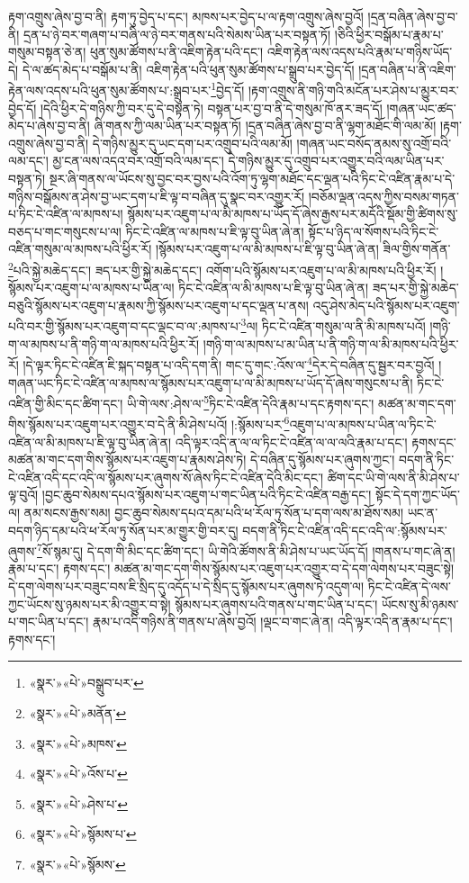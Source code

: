 རྟག་འགྲུས་ཞེས་བྱ་བ་ནི། རྟག་ཏུ་བྱེད་པ་དང་། མཁས་པར་བྱེད་པ་ལ་རྟག་འགྲུས་ཞེས་བྱའོ། །དྲན་བཞིན་ཞེས་བྱ་བ་ནི། དྲན་པ་ཉེ་བར་གཞག་པ་བཞི་ལ་ཉེ་བར་གནས་པའི་སེམས་ཡིན་པར་བསྟན་ཏོ། །ཅིའི་ཕྱིར་བསྒོམ་པ་རྣམ་པ་གསུམ་བསྟན་ཅེ་ན། ཕུན་སུམ་ཚོགས་པ་ནི་འཇིག་རྟེན་པའི་དང་། འཇིག་རྟེན་ལས་འདས་པའི་རྣམ་པ་གཉིས་ཡོད་དེ། དེ་ལ་ཚད་མེད་པ་བསྒོམ་པ་ནི། འཇིག་རྟེན་པའི་ཕུན་སུམ་ཚོགས་པ་སྒྲུབ་པར་བྱེད་དོ། །དྲན་བཞིན་པ་ནི་འཇིག་རྟེན་ལས་འདས་པའི་ཕུན་སུམ་ཚོགས་པ་:སྒྲུབ་པར་\footnote{«སྣར་»«པེ་»བསྒྲུབ་པར་}བྱེད་དོ། །རྟག་འགྲུས་ནི་གཉི་གའི་མངོན་པར་ཤེས་པ་མྱུར་བར་བྱེད་དོ། །དེའི་ཕྱིར་དེ་གཉིས་ཀྱི་བར་དུ་དེ་བསྟན་ཏེ། བསྟན་པར་བྱ་བ་ནི་དེ་གསུམ་ཁོ་ནར་ཟད་དོ། །གཞན་ཡང་ཚད་མེད་པ་ཞེས་བྱ་བ་ནི། ཞི་གནས་ཀྱི་ལམ་ཡིན་པར་བསྟན་ཏོ། །དྲན་བཞིན་ཞེས་བྱ་བ་ནི་ལྷག་མཐོང་གི་ལམ་མོ། །རྟག་འགྲུས་ཞེས་བྱ་བ་ནི། དེ་གཉིས་མྱུར་དུ་ཡང་དག་པར་འགྲུབ་པའི་ལམ་མོ། །གཞན་ཡང་བསོད་ནམས་སུ་འགྲོ་བའི་ལམ་དང་། མྱ་ངན་ལས་འདའ་བར་འགྲོ་བའི་ལམ་དང་། དེ་གཉིས་མྱུར་དུ་འགྲུབ་པར་འགྱུར་བའི་ལམ་ཡིན་པར་བསྟན་ཏེ། སྔར་ཞི་གནས་ལ་ཡོངས་སུ་བྱང་བར་བྱས་པའི་འོག་ཏུ་ལྷག་མཐོང་དང་ལྡན་པའི་ཏིང་ངེ་འཛིན་རྣམ་པ་དེ་གཉིས་བསྒོམས་ན་ཤེས་བྱ་ཡང་དག་པ་ཇི་ལྟ་བ་བཞིན་དུ་སྣང་བར་འགྱུར་རོ། །བཅོམ་ལྡན་འདས་ཀྱིས་བསམ་གཏན་པ་ཏིང་ངེ་འཛིན་ལ་མཁས་པ། སྙོམས་པར་འཇུག་པ་ལ་མི་མཁས་པ་ཡོད་དོ་ཞེས་རྒྱས་པར་མདོའི་སྡོམ་གྱི་ཚིགས་སུ་བཅད་པ་གང་གསུངས་པ་ལ། ཏིང་ངེ་འཛིན་ལ་མཁས་པ་ཇི་ལྟ་བུ་ཡིན་ཞེ་ན། སྟོང་པ་ཉིད་ལ་སོགས་པའི་ཏིང་ངེ་འཛིན་གསུམ་ལ་མཁས་པའི་ཕྱིར་རོ། །སྙོམས་པར་འཇུག་པ་ལ་མི་མཁས་པ་ཇི་ལྟ་བུ་ཡིན་ཞེ་ན། ཟིལ་གྱིས་གནོན་\footnote{«སྣར་»«པེ་»མནོན་}པའི་སྐྱེ་མཆེད་དང་། ཟད་པར་གྱི་སྐྱེ་མཆེད་དང་། འགོག་པའི་སྙོམས་པར་འཇུག་པ་ལ་མི་མཁས་པའི་ཕྱིར་རོ། །སྙོམས་པར་འཇུག་པ་ལ་མཁས་པ་ཡིན་ལ། ཏིང་ངེ་འཛིན་ལ་མི་མཁས་པ་ཇི་ལྟ་བུ་ཡིན་ཞེ་ན། ཟད་པར་གྱི་སྐྱེ་མཆེད་བཅུའི་སྙོམས་པར་འཇུག་པ་རྣམས་ཀྱི་སྙོམས་པར་འཇུག་པ་དང་ལྡན་པ་ནས། འདུ་ཤེས་མེད་པའི་སྙོམས་པར་འཇུག་པའི་བར་གྱི་སྙོམས་པར་འཇུག་བ་དང་ལྡང་བ་ལ་:མཁས་པ་\footnote{«སྣར་»«པེ་»མཁས་}ལ། ཏིང་ངེ་འཛིན་གསུམ་ལ་ནི་མི་མཁས་པའོ། །གཉི་ག་ལ་མཁས་པ་ནི་གཉི་ག་ལ་མཁས་པའི་ཕྱིར་རོ། །གཉི་ག་ལ་མཁས་པ་མ་ཡིན་པ་ནི་གཉི་ག་ལ་མི་མཁས་པའི་ཕྱིར་རོ། །དེ་ལྟར་ཏིང་ངེ་འཛིན་ཇི་སྐད་བསྟན་པ་འདི་དག་ནི། གང་དུ་གང་:འོས་ལ་\footnote{«སྣར་»«པེ་»འོས་པ་}དེར་དེ་བཞིན་དུ་སྦྱར་བར་བྱའོ། །གཞན་ཡང་ཏིང་ངེ་འཛིན་ལ་མཁས་ལ་སྙོམས་པར་འཇུག་པ་ལ་མི་མཁས་པ་ཡོད་དོ་ཞེས་གསུངས་པ་ནི། ཏིང་ངེ་འཛིན་གྱི་མིང་དང་ཚིག་དང་། ཡི་གེ་ལས་:ཤེས་ལ་\footnote{«སྣར་»«པེ་»ཤེས་པ་}ཏིང་ངེ་འཛིན་དེའི་རྣམ་པ་དང་རྟགས་དང་། མཚན་མ་གང་དག་གིས་སྙོམས་པར་འཇུག་པར་འགྱུར་བ་དེ་ནི་མི་ཤེས་པའོ། །:སྙོམས་པར་\footnote{«སྣར་»«པེ་»སྙོམས་པ་}འཇུག་པ་ལ་མཁས་པ་ཡིན་ལ་ཏིང་ངེ་འཛིན་ལ་མི་མཁས་པ་ཇི་ལྟ་བུ་ཡིན་ཞེ་ན། འདི་ལྟར་འདི་ན་ལ་ལ་ཏིང་ངེ་འཛིན་ལ་ལ་ལའི་རྣམ་པ་དང་། རྟགས་དང་མཚན་མ་གང་དག་གིས་སྙོམས་པར་འཇུག་པ་རྣམས་ཤེས་ཏེ། དེ་བཞིན་དུ་སྙོམས་པར་ཞུགས་ཀྱང་། བདག་ནི་ཏིང་ངེ་འཛིན་འདི་དང་འདི་ལ་སྙོམས་པར་ཞུགས་སོ་ཞེས་ཏིང་ངེ་འཛིན་དེའི་མིང་དང་། ཚིག་དང་ཡི་གེ་ལས་ནི་མི་ཤེས་པ་ལྟ་བུའོ། །བྱང་ཆུབ་སེམས་དཔའ་སྙོམས་པར་འཇུག་པ་གང་ཡིན་པའི་ཏིང་ངེ་འཛིན་བརྒྱ་དང་། སྟོང་དེ་དག་ཀྱང་ཡོད་ལ། ནམ་སངས་རྒྱས་སམ། བྱང་ཆུབ་སེམས་དཔའ་དམ་པའི་ཕ་རོལ་ཏུ་སོན་པ་དག་ལས་མ་ཐོས་སམ། ཡང་ན་བདག་ཉིད་དམ་པའི་ཕ་རོལ་ཏུ་སོན་པར་མ་གྱུར་གྱི་བར་དུ། བདག་ནི་ཏིང་ངེ་འཛིན་འདི་དང་འདི་ལ་:སྙོམས་པར་ཞུགས་\footnote{«སྣར་»«པེ་»སྙོམས་}སོ་སྙམ་དུ། དེ་དག་གི་མིང་དང་ཚིག་དང་། ཡི་གེའི་ཚོགས་ནི་མི་ཤེས་པ་ཡང་ཡོད་དོ། །གནས་པ་གང་ཞེ་ན། རྣམ་པ་དང་། རྟགས་དང་། མཚན་མ་གང་དག་གིས་སྙོམས་པར་འཇུག་པར་འགྱུར་བ་དེ་དག་ལེགས་པར་བཟུང་སྟེ། དེ་དག་ལེགས་པར་བཟུང་བས་ཇི་སྲིད་དུ་འདོད་པ་དེ་སྲིད་དུ་སྙོམས་པར་ཞུགས་ཏེ་འདུག་ལ། ཏིང་ངེ་འཛིན་དེ་ལས་ཀྱང་ཡོངས་སུ་ཉམས་པར་མི་འགྱུར་བ་སྟེ། སྙོམས་པར་ཞུགས་པའི་གནས་པ་གང་ཡིན་པ་དང་། ཡོངས་སུ་མི་ཉམས་པ་གང་ཡིན་པ་དང་། རྣམ་པ་འདི་གཉིས་ནི་གནས་པ་ཞེས་བྱའོ། །ལྡང་བ་གང་ཞེ་ན། འདི་ལྟར་འདི་ན་རྣམ་པ་དང་། རྟགས་དང་། 